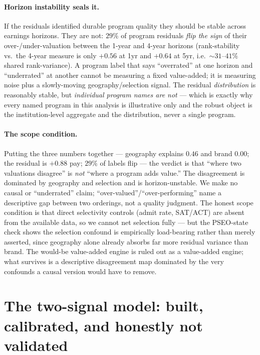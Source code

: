 \documentclass[11pt]{article}
\begin{document}
\paragraph{Horizon instability seals it.} If the residuals identified durable program quality they should be stable across earnings horizons. They are not: $29\%$ of program residuals \emph{flip the sign} of their over-/under-valuation between the 1-year and 4-year horizons (rank-stability vs.\ the 4-year measure is only $+0.56$ at 1yr and $+0.64$ at 5yr, i.e.\ $\sim 31$--$41\%$ shared rank-variance). A program label that says ``overrated'' at one horizon and ``underrated'' at another cannot be measuring a fixed value-added; it is measuring noise plus a slowly-moving geography/selection signal. The residual \emph{distribution} is reasonably stable, but \emph{individual program names are not} --- which is exactly why every named program in this analysis is illustrative only and the robust object is the institution-level aggregate and the distribution, never a single program.

\paragraph{The scope condition.} Putting the three numbers together --- geography explains $0.46$ and brand $0.00$; the residual is $+0.88$ pay; $29\%$ of labels flip --- the verdict is that ``where two valuations disagree'' is \emph{not} ``where a program adds value.'' The disagreement is dominated by geography and selection and is horizon-unstable. We make no causal or ``underrated'' claim; ``over-valued''/``over-performing'' name a descriptive gap between two orderings, not a quality judgment. The honest scope condition is that direct selectivity controls (admit rate, SAT/ACT) are absent from the available data, so we cannot net selection fully --- but the PSEO-state check shows the selection confound is empirically load-bearing rather than merely asserted, since geography alone already absorbs far more residual variance than brand. The would-be value-added engine is ruled out as a value-added engine; what survives is a descriptive disagreement map dominated by the very confounds a causal version would have to remove.\section{The two-signal model: built, calibrated, and honestly not validated}\label{sec:model-companion}
\end{document}
